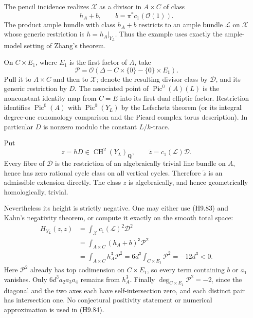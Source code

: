 The pencil incidence realizes $\mathcal X$ as a divisor in
$A\times C$ of class
\[
                        h_A+b,\qquad b=\pi^*c_1(\mathcal O(1)).
\]
The product ample bundle with class $h_A+b$ restricts to an ample
bundle $\mathcal L$ on $\mathcal X$ whose generic restriction is
$h=h_A|_{Y_L}$. Thus the example uses exactly the ample-model
setting of Zhang's theorem.

On $C\times E_1$, where $E_1$ is the first factor of $A$, take
\[
 \mathcal P=\mathcal O(\Delta-C\times\{0\}-\{0\}\times E_1).
\]
Pull it to $A\times C$ and then to $\mathcal X$; denote the
resulting divisor class by $\mathcal D$, and its generic
restriction by $D$. The associated point of
$\operatorname{Pic}^0(A)(L)$ is the nonconstant identity map from
$C=E$ into its first dual elliptic factor. Restriction identifies
$\operatorname{Pic}^0(A)$ with $\operatorname{Pic}^0(Y_L)$ by the
Lefschetz theorem (or its integral degree-one cohomology comparison
and the Picard complex torus description). In particular $D$ is
nonzero modulo the constant $L/k$-trace.

Put
\[
                z=hD\in\operatorname{CH}^2(Y_L)_{\mathbf Q},
       \qquad \widetilde z=c_1(\mathcal L)\mathcal D.
\]
Every fibre of $\mathcal D$ is the restriction of an algebraically
trivial line bundle on $A$, hence has zero rational cycle class on
all vertical cycles. Therefore $\widetilde z$ is an admissible
extension directly. The class $z$ is algebraically, and hence
geometrically homologically, trivial.

Nevertheless its height is strictly negative. One may either use
(H9.83) and Kahn's negativity theorem, or compute it exactly on the
smooth total space:
\[
 \begin{aligned}
 H_{Y_L}(z,z)
  &=\int_{\mathcal X}c_1(\mathcal L)^2\mathcal D^2\\
  &=\int_{A\times C}(h_A+b)^3\mathcal P^2\\
  &=\int_{A\times C}h_A^3\mathcal P^2
    =6d^3\int_{C\times E_1}\mathcal P^2
    =-12d^3<0.
 \end{aligned}                                               \tag{H9.84}
\]
Here $\mathcal P^2$ already has top codimension on $C\times E_1$,
so every term containing $b$ or $a_1$ vanishes. Only
$6d^3a_2a_3a_4$ remains from $h_A^3$. Finally
$\deg_{C\times E_1}\mathcal P^2=-2$, since the diagonal and the
two axes each have self-intersection zero, and each distinct pair
has intersection one. No conjectural positivity statement or
numerical approximation is used in (H9.84).

